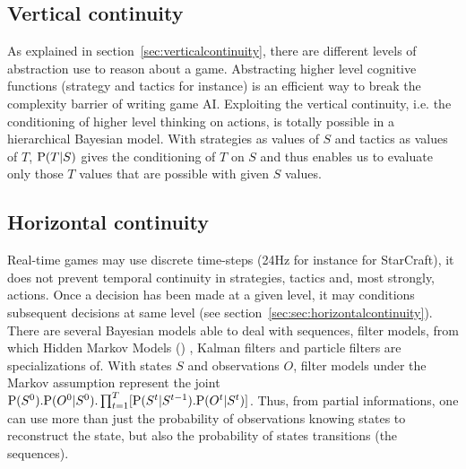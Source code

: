 \subsection{Vertical continuity}
As explained in section~\ref{sec:verticalcontinuity}, there are different levels of abstraction use to reason about a game. Abstracting higher level cognitive functions (strategy and tactics for instance) is an efficient way to break the complexity barrier of writing game AI. Exploiting the vertical continuity, i.e. the conditioning of higher level thinking on actions, is totally possible in a hierarchical Bayesian model. With strategies as values of $S$ and tactics as values of $T$, $\mathrm{P}(T|S)$ gives the conditioning of $T$ on $S$ and thus enables us to evaluate only those $T$ values that are possible with given $S$ values.

\subsection{Horizontal continuity}
Real-time games may use discrete time-steps (24Hz for instance for StarCraft), it does not prevent temporal continuity in strategies, tactics and, most strongly, actions. Once a decision has been made at a given level, it may conditions subsequent decisions at same level (see section~\ref{sec:sec:horizontalcontinuity}). There are several Bayesian models able to deal with sequences, filter models, from which Hidden Markov Models () \citep{Rabiner}, Kalman filters \citep{Kalman1960} and particle filters \citep{particleFiltering} are specializations of. With states $S$ and observations $O$, filter models under the Markov assumption represent the joint $\mathrm{P}(S^0).\mathrm{P}(O^0|S^0).\prod_{t=1}^T[\mathrm{P}(S^t | S^{t-1}).\mathrm{P}(O^t|S^t)]$. Thus, from partial informations, one can use more than just the probability of observations knowing states to reconstruct the state, but also the probability of states transitions (the sequences).

